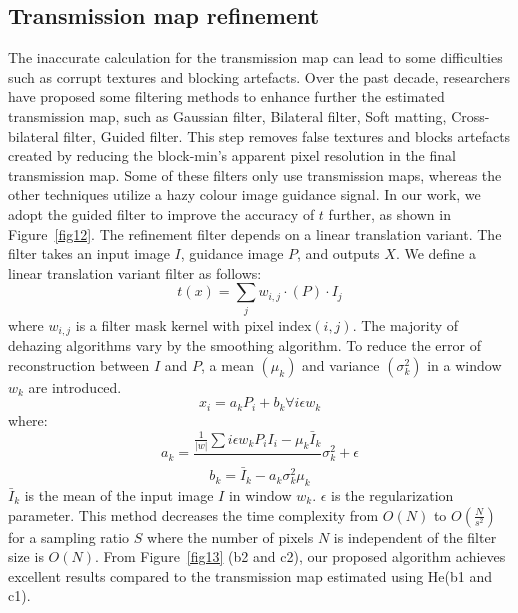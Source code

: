 \documentclass[doctor,english,listoffigures,listoftables]{thesis-uestc}
\begin{document}
\subsection{Transmission map refinement} 
The inaccurate calculation for the transmission map can lead to some difficulties such as corrupt textures and blocking artefacts. Over the past decade, researchers have proposed some filtering methods to enhance further the estimated transmission map, such as Gaussian filter, Bilateral filter, Soft matting, Cross-bilateral filter, Guided filter. This step removes false textures and blocks artefacts created by reducing the block-min's apparent pixel resolution in the final transmission map. Some of these filters only use transmission maps, whereas the other techniques utilize a hazy colour image guidance signal. 
In our work, we adopt the guided filter to improve the accuracy of $t$ further, as shown in Figure~\ref{fig12}. The refinement filter depends on a linear translation variant. The filter takes an input image $I$, guidance image $P$, and outputs $X$. We define a linear translation variant filter as follows:
\begin{equation}
t(x)=\sum_j w_{i,j} \cdot (P)\cdot I_j
\end{equation}
where $w_{i,j}$ is a filter mask kernel with pixel index${(i,j)}$. The majority of dehazing algorithms vary by the smoothing algorithm. To reduce the error of reconstruction between $I$ and $P$, a mean $(\mu_k)$ and variance $(\sigma_k^2 )$ in a window $w_k$ are introduced. 
\begin{equation} \label{eq2}
x_i=a_k P_i+b_k \forall i\epsilon w_k
\end{equation}
where:
\begin{equation}
a_k= \frac{\frac{1}{|w|} \sum i  \epsilon w_k P_i I_i -\mu_k \bar I_k}\, {\sigma_k^2  + \epsilon}
\end{equation}
\begin{equation}
b_k=  \bar I_k - a_k \sigma_k^2 \mu_k
\end{equation}
$\bar I_k$ is the mean of the input image $I$ in window $w_k$. $\epsilon$ is the regularization parameter. This method decreases the time complexity from $O(N)$ to $O(\frac{N}{s^2})$ for a sampling ratio $S$ where the number of pixels $N$ is independent of the filter size is $O(N)$. From Figure~\ref{fig13} (b2 and c2), our proposed algorithm achieves excellent results compared to the transmission map estimated using He(b1 and c1).    
\end{document}
